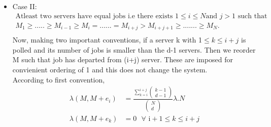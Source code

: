 \documentclass[a4paper,english,12pt]{article}
\begin{document}
\begin{itemize}
\item{Case II: }
\begin{align*}
\text{Atleast two servers have equal jobs i.e there exists } 1 \le i \le N \text{and } j > 1 \text{ such that } \\
M_1 \ge ..... \ge M_{i-1} \ge M_i = ...... = M_{i+j} > M_{i+j+1} \ge .......\ge M_N.\\
\end{align*}
Now, making  two important conventions, if a server k with 1$ \le k \le i+j$ is polled and its number of jobs is smaller than the d-1 servers. Then we reorder M  such that job has departed from (i+j) server. These are imposed for convienient ordering of 1 and this does not change the system.\\
According to first convention,\\
\begin{align*}
\lambda(M,M+e_i)&=\frac{\sum\limits_{k=i}^{i+j}\begin{pmatrix} k-1 \\ d-1 \end{pmatrix}}{\begin{pmatrix} N \\ d \end{pmatrix}}\lambda.N\\
\lambda(M,M+e_k) &= 0\text{   		 }   \forall \text{ 		  i}+1 \le k \le i+j  \\
\end{align*}


\end{itemize}
\end{document}
